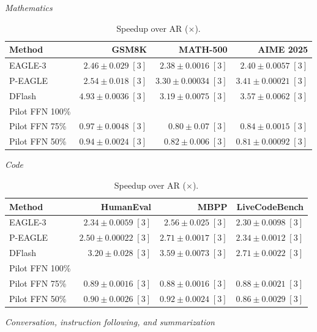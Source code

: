 \documentclass[conference,onecolumn]{IEEEtran}
\begin{document}
\begin{table}[!tp]
\centering
\small
\setlength{\tabcolsep}{3pt}
\caption{Speedup over AR (\(\times\)).}
\label{tab:speedup}
\textit{Mathematics}\par\smallskip
\begin{tabular}{@{}>{\raggedright\arraybackslash}p{3.7cm}rrr@{}}
\toprule
Method & GSM8K & MATH-500 & AIME 2025 \\
\midrule
EAGLE-3 & \(2.46 \pm 0.029\;[3]\) & \(2.38 \pm 0.0016\;[3]\) & \(2.40 \pm 0.0057\;[3]\) \\
P-EAGLE & \(2.54 \pm 0.018\;[3]\) & \(\mathbf{3.30} \pm 0.00034\;[3]\) & \(3.41 \pm 0.00021\;[3]\) \\
DFlash & \(\mathbf{4.93} \pm 0.0036\;[3]\) & \(3.19 \pm 0.0075\;[3]\) & \(\mathbf{3.57} \pm 0.0062\;[3]\) \\
Pilot FFN 100\% &  &  &  \\
Pilot FFN 75\% & \(0.97 \pm 0.0048\;[3]\) & \(0.80 \pm 0.07\;[3]\) & \(0.84 \pm 0.0015\;[3]\) \\
Pilot FFN 50\% & \(0.94 \pm 0.0024\;[3]\) & \(0.82 \pm 0.006\;[3]\) & \(0.81 \pm 0.00092\;[3]\) \\
\bottomrule
\end{tabular}
\par\medskip
\textit{Code}\par\smallskip
\begin{tabular}{@{}>{\raggedright\arraybackslash}p{3.7cm}rrr@{}}
\toprule
Method & HumanEval & MBPP & LiveCodeBench \\
\midrule
EAGLE-3 & \(2.34 \pm 0.0059\;[3]\) & \(2.56 \pm 0.025\;[3]\) & \(2.30 \pm 0.0098\;[3]\) \\
P-EAGLE & \(2.50 \pm 0.00022\;[3]\) & \(2.71 \pm 0.0017\;[3]\) & \(2.34 \pm 0.0012\;[3]\) \\
DFlash & \(\mathbf{3.20} \pm 0.028\;[3]\) & \(\mathbf{3.59} \pm 0.0073\;[3]\) & \(\mathbf{2.71} \pm 0.0022\;[3]\) \\
Pilot FFN 100\% &  &  &  \\
Pilot FFN 75\% & \(0.89 \pm 0.0016\;[3]\) & \(0.88 \pm 0.0016\;[3]\) & \(0.88 \pm 0.0021\;[3]\) \\
Pilot FFN 50\% & \(0.90 \pm 0.0026\;[3]\) & \(0.92 \pm 0.0024\;[3]\) & \(0.86 \pm 0.0029\;[3]\) \\
\bottomrule
\end{tabular}
\par\medskip
\textit{Conversation, instruction following, and summarization}\par\smallskip

\end{table}
\end{document}
